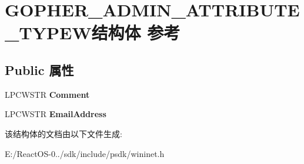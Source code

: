 \hypertarget{struct_g_o_p_h_e_r___a_d_m_i_n___a_t_t_r_i_b_u_t_e___t_y_p_e_w}{}\section{G\+O\+P\+H\+E\+R\+\_\+\+A\+D\+M\+I\+N\+\_\+\+A\+T\+T\+R\+I\+B\+U\+T\+E\+\_\+\+T\+Y\+P\+E\+W结构体 参考}
\label{struct_g_o_p_h_e_r___a_d_m_i_n___a_t_t_r_i_b_u_t_e___t_y_p_e_w}
\subsection*{Public 属性}
\begin{DoxyCompactItemize}
\item 
\mbox{\label{struct_g_o_p_h_e_r___a_d_m_i_n___a_t_t_r_i_b_u_t_e___t_y_p_e_w_a3fa1258ad1da81dcfe707200594ed447}} 
L\+P\+C\+W\+S\+TR {\bfseries Comment}
\item 
\mbox{\label{struct_g_o_p_h_e_r___a_d_m_i_n___a_t_t_r_i_b_u_t_e___t_y_p_e_w_af236cccce33f9f3553e8a579c63fa9b9}} 
L\+P\+C\+W\+S\+TR {\bfseries Email\+Address}
\end{DoxyCompactItemize}


该结构体的文档由以下文件生成\+:\begin{DoxyCompactItemize}
\item 
E\+:/\+React\+O\+S-\/0../sdk/include/psdk/wininet.\+h\end{DoxyCompactItemize}

